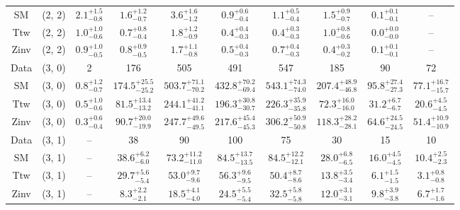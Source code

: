 \begin{table}[h!]
{\begin{tabular}{cccccccccc}
	SM & (2, 2) & $2.1^{+ 1.5 }_{- 0.8 }$ & $1.6^{+ 1.2 }_{- 0.7 }$ & $3.6^{+ 1.6 }_{- 1.2 }$ & $0.9^{+ 0.6 }_{- 0.4 }$ & $1.1^{+ 0.5 }_{- 0.4 }$ & $1.5^{+ 0.9 }_{- 0.7 }$ & $0.1^{+ 0.1 }_{- 0.1 }$ & -- \\[0.5ex] 
	Ttw & (2, 2) & $1.0^{+ 1.0 }_{- 0.6 }$ & $0.7^{+ 0.8 }_{- 0.4 }$ & $1.8^{+ 1.2 }_{- 0.9 }$ & $0.4^{+ 0.4 }_{- 0.3 }$ & $0.4^{+ 0.3 }_{- 0.3 }$ & $1.0^{+ 0.8 }_{- 0.6 }$ & $0.0^{+ 0.0 }_{- 0.0 }$ & -- \\[0.5ex] 
	Zinv & (2, 2) & $0.9^{+ 1.0 }_{- 0.5 }$ & $0.8^{+ 0.9 }_{- 0.5 }$ & $1.7^{+ 1.1 }_{- 0.8 }$ & $0.5^{+ 0.4 }_{- 0.3 }$ & $0.7^{+ 0.4 }_{- 0.3 }$ & $0.4^{+ 0.3 }_{- 0.2 }$ & $0.1^{+ 0.1 }_{- 0.1 }$ & -- \\[0.5ex] 
	Data & (3, 0) & 2 & 176 & 505 & 491 & 547 & 185 & 90 & 72 \\[0.5ex] 
	SM & (3, 0) & $0.8^{+ 1.2 }_{- 0.7 }$ & $174.5^{+ 25.5 }_{- 25.2 }$ & $503.7^{+ 71.1 }_{- 70.2 }$ & $432.8^{+ 70.2 }_{- 69.4 }$ & $543.1^{+ 74.3 }_{- 74.0 }$ & $207.4^{+ 48.9 }_{- 46.8 }$ & $95.8^{+ 27.4 }_{- 27.3 }$ & $77.1^{+ 16.7 }_{- 15.7 }$ \\[0.5ex] 
	Ttw & (3, 0) & $0.5^{+ 1.0 }_{- 0.6 }$ & $81.5^{+ 13.4 }_{- 13.2 }$ & $244.1^{+ 41.2 }_{- 41.1 }$ & $196.3^{+ 30.8 }_{- 30.7 }$ & $226.3^{+ 35.9 }_{- 35.8 }$ & $72.3^{+ 16.0 }_{- 16.0 }$ & $31.2^{+ 6.7 }_{- 6.7 }$ & $20.6^{+ 4.5 }_{- 4.5 }$ \\[0.5ex] 
	Zinv & (3, 0) & $0.3^{+ 0.6 }_{- 0.4 }$ & $90.7^{+ 20.0 }_{- 19.9 }$ & $247.7^{+ 49.6 }_{- 49.5 }$ & $217.6^{+ 45.4 }_{- 45.3 }$ & $306.2^{+ 50.9 }_{- 50.8 }$ & $118.3^{+ 28.2 }_{- 28.1 }$ & $64.6^{+ 24.5 }_{- 24.5 }$ & $51.4^{+ 10.9 }_{- 10.9 }$ \\[0.5ex] 
	Data & (3, 1) & -- & 38 & 90 & 100 & 75 & 30 & 15 & 10 \\[0.5ex] 
	SM & (3, 1) & -- & $38.6^{+ 6.2 }_{- 6.0 }$ & $73.2^{+ 11.2 }_{- 11.0 }$ & $84.5^{+ 13.7 }_{- 13.5 }$ & $84.5^{+ 12.2 }_{- 12.1 }$ & $28.0^{+ 6.8 }_{- 6.5 }$ & $16.0^{+ 4.5 }_{- 4.5 }$ & $10.4^{+ 2.5 }_{- 2.3 }$ \\[0.5ex] 
	Ttw & (3, 1) & -- & $29.7^{+ 5.6 }_{- 5.4 }$ & $53.0^{+ 9.7 }_{- 9.6 }$ & $56.3^{+ 9.6 }_{- 9.5 }$ & $50.4^{+ 8.7 }_{- 8.6 }$ & $13.8^{+ 3.5 }_{- 3.4 }$ & $6.1^{+ 1.5 }_{- 1.5 }$ & $3.1^{+ 0.8 }_{- 0.8 }$ \\[0.5ex] 
	Zinv & (3, 1) & -- & $8.3^{+ 2.2 }_{- 2.1 }$ & $18.5^{+ 4.1 }_{- 4.0 }$ & $24.5^{+ 5.5 }_{- 5.4 }$ & $32.5^{+ 5.8 }_{- 5.8 }$ & $12.0^{+ 3.1 }_{- 3.1 }$ & $9.8^{+ 3.9 }_{- 3.8 }$ & $6.7^{+ 1.7 }_{- 1.6 }$ \\[0.5ex] 

\end{tabular}}
\end{table}
